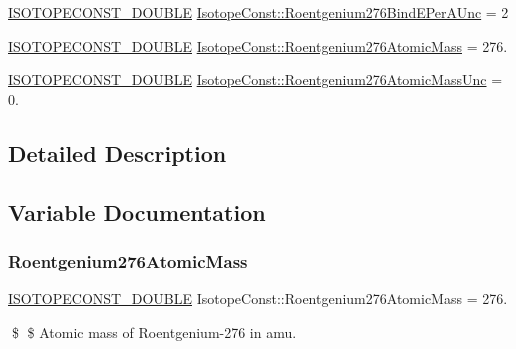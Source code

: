 \begin{DoxyCompactItemize}
\item 
\mbox{\hyperlink{group___isotope_const-_macros_ga8f45a7272ce02c0b4c65c44636ed719a}{I\+S\+O\+T\+O\+P\+E\+C\+O\+N\+S\+T\+\_\+\+D\+O\+U\+B\+LE}} \mbox{\hyperlink{group___isotope_const-_roentgenium-_rg276_ga0a3bcd6b4e37f5c5f625cd121b5e89c7}{Isotope\+Const\+::\+Roentgenium276\+Bind\+E\+Per\+A\+Unc}} = 2
\item 
\mbox{\hyperlink{group___isotope_const-_macros_ga8f45a7272ce02c0b4c65c44636ed719a}{I\+S\+O\+T\+O\+P\+E\+C\+O\+N\+S\+T\+\_\+\+D\+O\+U\+B\+LE}} \mbox{\hyperlink{group___isotope_const-_roentgenium-_rg276_ga63caca91ffe0b96673d46781cc1009b8}{Isotope\+Const\+::\+Roentgenium276\+Atomic\+Mass}} = 276.
\item 
\mbox{\hyperlink{group___isotope_const-_macros_ga8f45a7272ce02c0b4c65c44636ed719a}{I\+S\+O\+T\+O\+P\+E\+C\+O\+N\+S\+T\+\_\+\+D\+O\+U\+B\+LE}} \mbox{\hyperlink{group___isotope_const-_roentgenium-_rg276_gafece33216c925925f523b153999cbbcb}{Isotope\+Const\+::\+Roentgenium276\+Atomic\+Mass\+Unc}} = 0.
\end{DoxyCompactItemize}


\subsection{Detailed Description}


\subsection{Variable Documentation}
\mbox{\label{group___isotope_const-_roentgenium-_rg276_ga63caca91ffe0b96673d46781cc1009b8}} 
\subsubsection{\texorpdfstring{Roentgenium276\+Atomic\+Mass}{Roentgenium276AtomicMass}}
{\footnotesize\ttfamily \mbox{\hyperlink{group___isotope_const-_macros_ga8f45a7272ce02c0b4c65c44636ed719a}{I\+S\+O\+T\+O\+P\+E\+C\+O\+N\+S\+T\+\_\+\+D\+O\+U\+B\+LE}} Isotope\+Const\+::\+Roentgenium276\+Atomic\+Mass = 276.}

\$ \$ Atomic mass of Roentgenium-\/276 in amu. \mbox{\label{group___isotope_const-_roentgenium-_rg276_gafece33216c925925f523b153999cbbcb}} 
